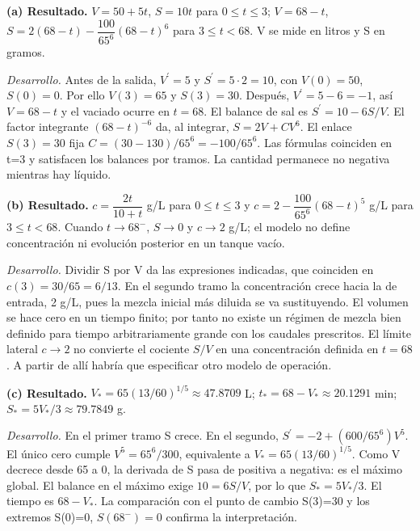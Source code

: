 \noindent\textbf{(a) Resultado.} $V=50+5t$, $S=10t$ para $0\le t\le3$; $V=68-t$, $S=2(68-t)-\dfrac{100}{65^6}(68-t)^6$ para $3\le t<68$. V se mide en litros y S en gramos.

\noindent\textit{Desarrollo.} Antes de la salida, $V^{\prime}=5$ y $S^{\prime}=5\cdot2=10$, con $V(0)=50$, $S(0)=0$. Por ello $V(3)=65$ y $S(3)=30$. Después, $V^{\prime}=5-6=-1$, así $V=68-t$ y el vaciado ocurre en $t=68$. El balance de sal es $S^{\prime}=10-6S/V$. El factor integrante $(68-t)^{-6}$ da, al integrar, $S=2V+CV^6$. El enlace $S(3)=30$ fija $C=(30-130)/65^6=-100/65^6$. Las fórmulas coinciden en t=3 y satisfacen los balances por tramos. La cantidad permanece no negativa mientras hay líquido.

\medskip

\noindent\textbf{(b) Resultado.} $c=\dfrac{2t}{10+t}$ g/L para $0\le t\le3$ y $c=2-\dfrac{100}{65^6}(68-t)^5$ g/L para $3\le t<68$. Cuando $t\to68^-$, $S\to0$ y $c\to2$ g/L; el modelo no define concentración ni evolución posterior en un tanque vacío.

\noindent\textit{Desarrollo.} Dividir S por V da las expresiones indicadas, que coinciden en $c(3)=30/65=6/13$. En el segundo tramo la concentración crece hacia la de entrada, 2 g/L, pues la mezcla inicial más diluida se va sustituyendo. El volumen se hace cero en un tiempo finito; por tanto no existe un régimen de mezcla bien definido para tiempo arbitrariamente grande con los caudales prescritos. El límite lateral $c\to2$ no convierte el cociente $S/V$ en una concentración definida en $t=68$. A partir de allí habría que especificar otro modelo de operación.

\medskip

\noindent\textbf{(c) Resultado.} $V_*=65(13/60)^{1/5}\approx47.8709$ L; $t_*=68-V_*\approx20.1291$ min; $S_*=5V_*/3\approx79.7849$ g.

\noindent\textit{Desarrollo.} En el primer tramo S crece. En el segundo, $S^{\prime}=-2+(600/65^6)V^5$. El único cero cumple $V^5=65^6/300$, equivalente a $V_*=65(13/60)^{1/5}$. Como V decrece desde 65 a 0, la derivada de S pasa de positiva a negativa: es el máximo global. El balance en el máximo exige $10=6S/V$, por lo que $S_*=5V_*/3$. El tiempo es $68-V_*$. La comparación con el punto de cambio S(3)=30 y los extremos S(0)=0, \(S(68^-)=0\) confirma la interpretación.
